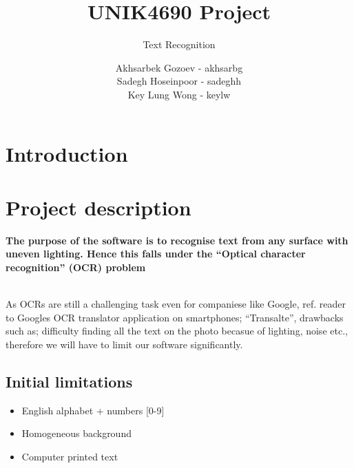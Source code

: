 \documentclass[11pt,a4paper,UKenglish]{article}
\title{UNIK4690 Project}
\subtitle{Text Recognition}
\author{
  Akhsarbek Gozoev  - akhsarbg \\
  Sadegh Hoseinpoor - sadeghh\\
  Key Lung Wong - keylw
}
\begin{document}
\ififorside[kind={Oppgave Rapport}]

\newpage
\tableofcontents
\newpage
\section{Introduction}

\section{Project description}
\textbf{The purpose of the software is to recognise text from any
surface with uneven lighting. Hence this falls under the ``Optical
character recognition'' (OCR) problem}

\noindent \\ As OCRs are still a challenging task even for companiese like
Google, ref. reader to Googles OCR translator application on smartphones;
``Transalte'', drawbacks such as; difficulty finding all the text on the photo
becasue of lighting, noise etc., therefore we will have to limit our software
significantly.


\subsection{Initial limitations}
\begin{itemize}
 \item{English alphabet + numbers [0-9]}
 \item{Homogeneous background}
 \item{Computer printed text}
\end{itemize}
\end{document}
